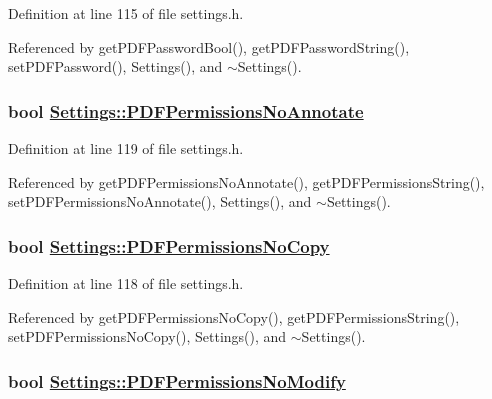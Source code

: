 Definition at line 115 of file settings.h.

Referenced by get\-PDFPassword\-Bool(), get\-PDFPassword\-String(), set\-PDFPassword(), Settings(), and $\sim$Settings().\hypertarget{classSettings_r26}{
\subsubsection[PDFPermissionsNoAnnotate]{\setlength{\rightskip}{0pt plus 5cm}bool \hyperlink{classSettings_r26}{Settings::PDFPermissions\-No\-Annotate}}}
\label{classSettings_r26}


Definition at line 119 of file settings.h.

Referenced by get\-PDFPermissions\-No\-Annotate(), get\-PDFPermissions\-String(), set\-PDFPermissions\-No\-Annotate(), Settings(), and $\sim$Settings().\hypertarget{classSettings_r25}{
\subsubsection[PDFPermissionsNoCopy]{\setlength{\rightskip}{0pt plus 5cm}bool \hyperlink{classSettings_r25}{Settings::PDFPermissions\-No\-Copy}}}
\label{classSettings_r25}


Definition at line 118 of file settings.h.

Referenced by get\-PDFPermissions\-No\-Copy(), get\-PDFPermissions\-String(), set\-PDFPermissions\-No\-Copy(), Settings(), and $\sim$Settings().\hypertarget{classSettings_r24}{
\subsubsection[PDFPermissionsNoModify]{\setlength{\rightskip}{0pt plus 5cm}bool \hyperlink{classSettings_r24}{Settings::PDFPermissions\-No\-Modify}}}
\label{classSettings_r24}


